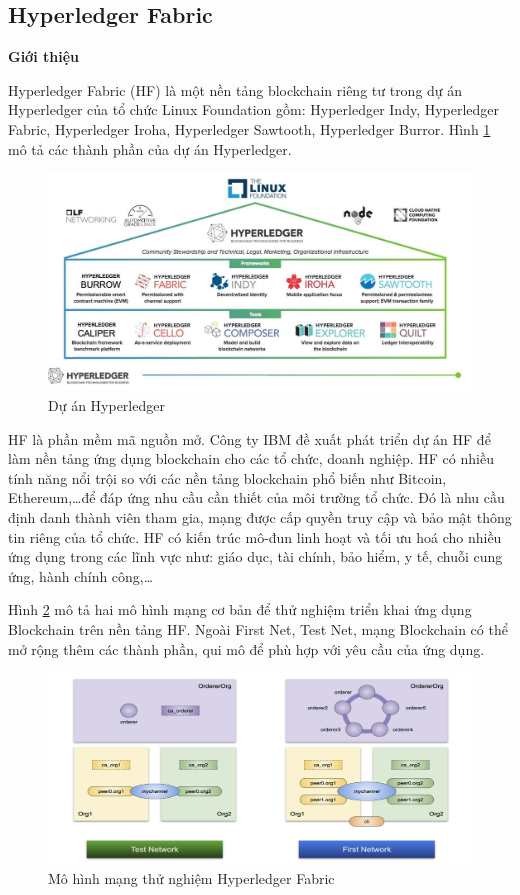 \subsection{Hyperledger Fabric}

\textbf{Giới thiệu}

Hyperledger Fabric (HF) là một nền tảng blockchain riêng tư trong dự án Hyperledger của tổ chức Linux Foundation gồm: Hyperledger Indy, Hyperledger Fabric, Hyperledger Iroha, Hyperledger Sawtooth, Hyperledger Burror.
Hình \ref{fig:hlf_um} mô tả các thành phần của dự án Hyperledger.

\begin{figure}[htbp]
\centering
\includegraphics[width=.9\linewidth]{img/hlf_um.jpg}
\caption{Dự án Hyperledger}
\label{fig:hlf_um}
\end{figure}

HF là phần mềm mã nguồn mở.
Công ty IBM đề xuất phát triển dự án HF để làm nền tảng ứng dụng blockchain cho các tổ chức, doanh nghiệp. 
HF có nhiều tính năng nổi trội so với các nền tảng blockchain phổ biến như Bitcoin, Ethereum,\ldots để đáp ứng nhu cầu cần thiết của môi trường tổ chức.
Đó là nhu cầu định danh thành viên tham gia, mạng được cấp quyền truy cập và bảo mật thông tin riêng của tổ chức.
HF có kiến trúc mô-đun linh hoạt và tối ưu hoá cho nhiều ứng dụng trong các lĩnh vực như: giáo dục, tài chính, bảo hiểm, y tế, chuỗi cung ứng, hành chính công,\ldots{}

Hình \ref{fig:hlf_network} mô tả hai mô hình mạng cơ bản để thử nghiệm triển khai ứng dụng Blockchain trên nền tảng HF.
Ngoài First Net, Test Net, mạng Blockchain có thể mở rộng thêm các thành phần, qui mô để phù hợp với yêu cầu của ứng dụng. 

\begin{figure}[htbp]
\centering
\includegraphics[width=.9\linewidth]{img/hlf_network.png}
\caption{Mô hình mạng thử nghiệm Hyperledger Fabric}
\label{fig:hlf_network}
\end{figure}

